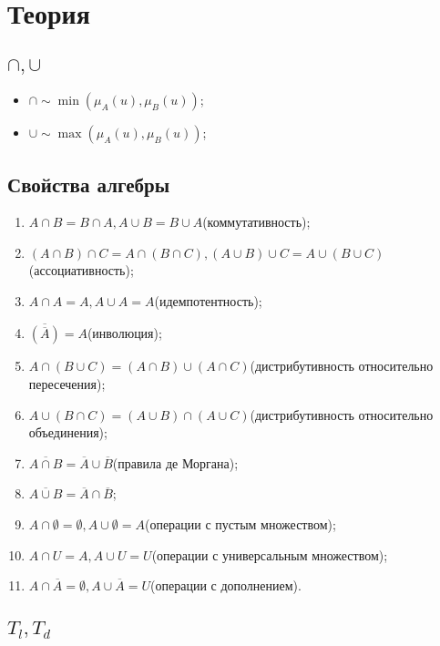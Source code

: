 \documentclass[12pt]{article}
\begin{document}
\section{Теория}

\subsection{$\cap, \cup$}

\begin{itemize}
    \item $\cap\sim\min\left(\mu_A(u), \mu_B(u)\right)$;
    \item $\cup\sim\max\left(\mu_A(u), \mu_B(u)\right)$;
\end{itemize}

\subsection{Свойства алгебры}

\begin{enumerate}
    \item $A\cap B = B\cap A, A\cup B=B\cup A$(коммутативность);
    \item $(A\cap B)\cap C = A\cap(B\cap C), (A\cup B)\cup C = A\cup(B\cup C)$(ассоциативность);
    \item $A\cap A=A, A\cup A = A$(идемпотентность);
    \item $\overline{(\overline{A})}=A$(инволюция);
    \item $A\cap(B\cup C) = (A\cap B)\cup(A\cap C)$(дистрибутивность относительно пересечения);
    \item $A\cup(B\cap C) = (A\cup B)\cap(A\cup C)$(дистрибутивность относительно объединения);
    \item $\overline{A\cap B}=\overline{A}\cup\overline{B}$(правила де Моргана);
    \item $\overline{A\cup B}=\overline{A}\cap\overline{B}$;
    \item $A\cap\emptyset=\emptyset, A\cup\emptyset=A$(операции с пустым множеством);
    \item $A\cap U=A,A\cup U = U$(операции с универсальным множеством);
    \item $A\cap\overline{A}=\emptyset, A\cup\overline{A}= U$(операции с дополнением).
\end{enumerate}

\subsection{$T_l, T_d$}
\end{document}
